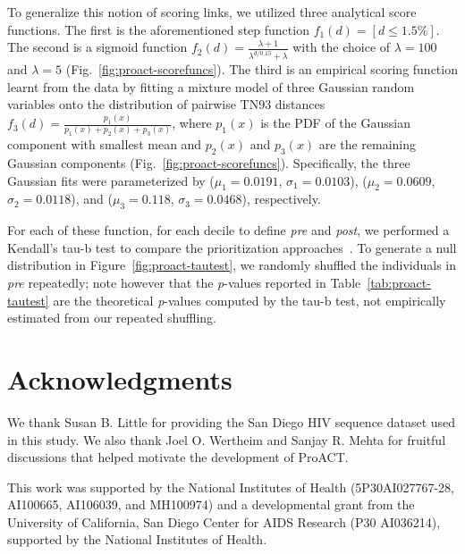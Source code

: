 To generalize this notion of scoring links, we utilized three analytical score functions. The first is the aforementioned step function $f_1(d)=\left[d\le1.5\%\right]$. The second is a sigmoid function $f_2(d)=\frac{\lambda+1}{\lambda^{d/0.15}+\lambda}$ with the choice of $\lambda=100$ and $\lambda=5$ (Fig.~\ref{fig:proact-scorefuncs}). The third is an empirical scoring function learnt from the data by fitting a mixture model of three Gaussian random variables onto the distribution of pairwise \gls{TN93} distances $f_3(d)=\frac{p_1(x)}{p_1(x)+p_2(x)+p_3(x)}$, where $p_1(x)$ is the \gls{PDF} of the Gaussian component with smallest mean and $p_2(x)$ and $p_3(x)$ are the remaining Gaussian components (Fig.~\ref{fig:proact-scorefuncs}). Specifically, the three Gaussian fits were parameterized by ($\mu_1=0.0191$, $\sigma_1=0.0103$), ($\mu_2=0.0609$, $\sigma_2=0.0118$), and ($\mu_3=0.118$, $\sigma_3=0.0468$), respectively.

For each of these function, for each decile to define \textit{pre} and \textit{post}, we performed a Kendall's tau-b test to compare the prioritization approaches~\cite{Kendall1938}. To generate a null distribution in Figure~\ref{fig:proact-tautest}, we randomly shuffled the individuals in \textit{pre} repeatedly; note however that the \textit{p}-values reported in Table~\ref{tab:proact-tautest} are the theoretical \textit{p}-values computed by the tau-b test, not empirically estimated from our repeated shuffling.

\section{Acknowledgments}
We thank Susan B. Little for providing the San Diego \gls{HIV} sequence dataset used in this study. We also thank Joel O. Wertheim and Sanjay R. Mehta for fruitful discussions that helped motivate the development of ProACT.

This work was supported by the National Institutes of Health (5P30AI027767-28, AI100665, AI106039, and MH100974) and a developmental grant from the University of California, San Diego Center for AIDS Research (P30 AI036214), supported by the National Institutes of Health.

